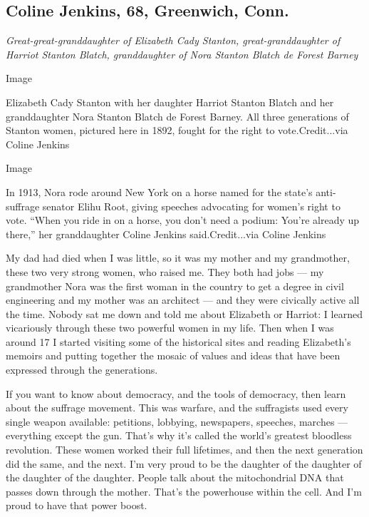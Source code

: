 \hypertarget{coline-jenkins-68-greenwich-conn}{%
\subsection{Coline Jenkins, 68, Greenwich,
Conn.}\label{coline-jenkins-68-greenwich-conn}}

\emph{Great-great-granddaughter of Elizabeth Cady Stanton,
great-granddaughter of Harriot Stanton Blatch, granddaughter of Nora
Stanton Blatch de Forest Barney}

Image

Elizabeth Cady Stanton with her daughter Harriot Stanton Blatch and her
granddaughter Nora Stanton Blatch de Forest Barney. All three
generations of Stanton women, pictured here in 1892, fought for the
right to vote.Credit...via Coline Jenkins

Image

In 1913, Nora rode around New York on a horse named for the state's
anti-suffrage senator Elihu Root, giving speeches advocating for women's
right to vote. ``When you ride in on a horse, you don't need a podium:
You're already up there,'' her granddaughter Coline Jenkins
said.Credit...via Coline Jenkins

My dad had died when I was little, so it was my mother and my
grandmother, these two very strong women, who raised me. They both had
jobs --- my grandmother Nora was the first woman in the country to get a
degree in civil engineering and my mother was an architect --- and they
were civically active all the time. Nobody sat me down and told me about
Elizabeth or Harriot: I learned vicariously through these two powerful
women in my life. Then when I was around 17 I started visiting some of
the historical sites and reading Elizabeth's memoirs and putting
together the mosaic of values and ideas that have been expressed through
the generations.

If you want to know about democracy, and the tools of democracy, then
learn about the suffrage movement. This was warfare, and the suffragists
used every single weapon available: petitions, lobbying, newspapers,
speeches, marches --- everything except the gun. That's why it's called
the world's greatest bloodless revolution. These women worked their full
lifetimes, and then the next generation did the same, and the next. I'm
very proud to be the daughter of the daughter of the daughter of the
daughter. People talk about the mitochondrial DNA that passes down
through the mother. That's the powerhouse within the cell. And I'm proud
to have that power boost.

